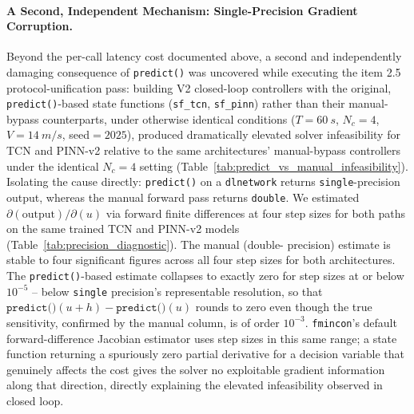 \paragraph{A Second, Independent Mechanism: Single-Precision Gradient
Corruption.} Beyond the per-call latency cost documented above, a
second and independently damaging consequence of \texttt{predict()}
was uncovered while executing the item 2.5 protocol-unification pass:
building V2 closed-loop controllers with the original,
\texttt{predict()}-based state functions (\texttt{sf\_tcn},
\texttt{sf\_pinn}) rather than their manual-bypass counterparts, under
otherwise identical conditions ($T=\SI{60}{s}$, $N_c=4$, $V=\SI{14}{m/s}$,
seed$=2025$), produced dramatically elevated solver infeasibility for
TCN and PINN-v2 relative to the same architectures' manual-bypass
controllers under the identical $N_c=4$ setting (Table~\ref{tab:predict_vs_manual_infeasibility}).
Isolating the cause directly: \texttt{predict()} on a
\texttt{dlnetwork} returns \texttt{single}-precision output, whereas
the manual forward pass returns \texttt{double}. We estimated
$\partial(\text{output})/\partial(u)$ via forward finite differences
at four step sizes for both paths on the same trained TCN and PINN-v2
models (Table~\ref{tab:precision_diagnostic}). The manual (double-
precision) estimate is stable to four significant figures across all
four step sizes for both architectures. The \texttt{predict()}-based
estimate collapses to exactly zero for step sizes at or below
$10^{-5}$ -- below \texttt{single} precision's representable
resolution, so that $\texttt{predict()}(u+h) - \texttt{predict()}(u)$
rounds to zero even though the true sensitivity, confirmed by the
manual column, is of order $10^{-3}$. \texttt{fmincon}'s default
forward-difference Jacobian estimator uses step sizes in this same
range; a state function returning a spuriously zero partial
derivative for a decision variable that genuinely affects the cost
gives the solver no exploitable gradient information along that
direction, directly explaining the elevated infeasibility observed in
closed loop.

